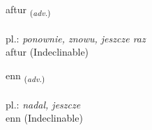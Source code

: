 \documentclass[frontgrid, backgrid]{flacards}\usepackage[]{graphicx}\usepackage[]{xcolor}
\begin{document}
\renewcommand{\flhead}{\vskip5pt \fboxsep=0pt {\small\bfseries\footnotesize Atviksorð | Adverb}}
\renewcommand{\fcfoot}{\vskip5pt \fboxsep=0pt \hspace{2pt}{\small\bfseries\footnotesize 1K}}

\renewcommand{\blhead}{\vskip5pt {\small\bfseries\footnotesize Atviksorð | Adverb }}
\renewcommand{\bcfoot}{\vskip5pt \hspace{2pt}{\small\bfseries\footnotesize 1K}}


{aftur \small{\textsubscript{(\textit{adv.})}} \\[1ex]
\textphonetic{[aftʏr]} \\
pl.: \emph{ponownie, znowu, jeszcze raz} \\  [2ex]
aftur (Indeclinable)}


\renewcommand{\flhead}{\vskip5pt \fboxsep=0pt {\small\bfseries\footnotesize Atviksorð | Adverb}}
\renewcommand{\fcfoot}{\vskip5pt \fboxsep=0pt \hspace{2pt}{\small\bfseries\footnotesize 1K}}

\renewcommand{\blhead}{\vskip5pt {\small\bfseries\footnotesize Atviksorð | Adverb }}
\renewcommand{\bcfoot}{\vskip5pt \hspace{2pt}{\small\bfseries\footnotesize 1K}}


{enn \small{\textsubscript{(\textit{adv.})}} \\[1ex]
\textphonetic{[ɛn]} \\
pl.: \emph{nadal, jeszcze} \\  [2ex]
enn (Indeclinable)}


\renewcommand{\flhead}{\vskip5pt \fboxsep=0pt {\small\bfseries\footnotesize Upphrópanir | Exclamation}}
\renewcommand{\fcfoot}{\vskip5pt \fboxsep=0pt \hspace{2pt}{\small\bfseries\footnotesize 1K}}

\renewcommand{\blhead}{\vskip5pt {\small\bfseries\footnotesize Upphrópanir | Exclamation }}
\renewcommand{\bcfoot}{\vskip5pt \hspace{2pt}{\small\bfseries\footnotesize 1K}}
\end{document}
